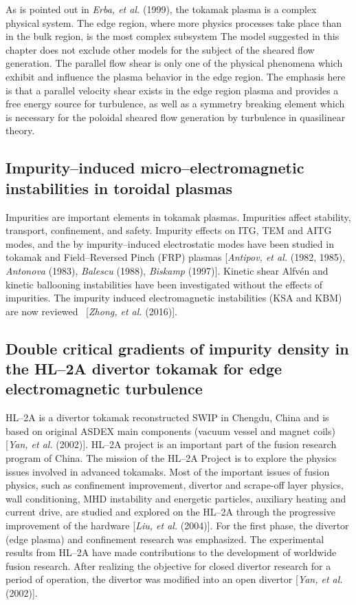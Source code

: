 \documentclass[a4paper,openany,12pt]{book}
\begin{document}
{As is pointed out in \emph{Erba, et al.} (1999), the tokamak plasma is a complex physical system. The edge region, where more physics processes take place than in the bulk region, is the most complex subsystem The model suggested in this chapter does not exclude other models for the subject of the sheared flow generation. The parallel flow shear is only one of the physical phenomena which exhibit and influence the plasma behavior in the edge region. The emphasis here is that a parallel velocity shear exists in the edge region plasma and provides a free energy source for turbulence, as well as a symmetry breaking element which is necessary for the poloidal sheared flow generation by turbulence in quasilinear theory.

\subsection{Impurity--induced micro--electromagnetic instabilities in toroidal plasmas}

Impurities are important elements in tokamak plasmas. Impurities affect stability, transport, confinement, and safety. Impurity effects on ITG, TEM and AITG modes, and the by impurity--induced electrostatic modes have been studied in tokamak and Field--Reversed Pinch (FRP) plasmas [\emph{Antipov, et al.} (1982, 1985), \emph{Antonova} (1983), \emph{Balescu} (1988), \emph{Biskamp} (1997)]. Kinetic shear Alfv\'en and kinetic ballooning instabilities have been investigated without the effects of impurities. The impurity induced electromagnetic instabilities (KSA and KBM) are now reviewed~
[\emph{Zhong, et al.} (2016)].

\subsection{Double critical gradients of impurity density in the HL--2A divertor tokamak for edge electromagnetic turbulence}

HL--2A is a divertor tokamak reconstructed  SWIP in Chengdu, China and is based on
original ASDEX main components (vacuum vessel and magnet coils) [\emph{Yan, et al.} (2002)]. HL--2A project is an important part of the fusion research program of China. The mission of the HL--2A Project is to explore the physics issues involved in advanced tokamaks. Most of the important issues of fusion physics, such as confinement improvement, divertor and scrape-off layer physics, wall
conditioning, MHD instability and energetic particles, auxiliary heating and current drive,
are studied and explored on the HL--2A through the progressive improvement of the
hardware [\emph{Liu, et al.} (2004)]. For the first phase, the divertor (edge plasma) and confinement research was emphasized. The experimental results from HL--2A have made contributions
to the development of worldwide fusion research. After realizing the objective for closed
divertor research for a period of operation, the divertor was modified into an open divertor [\emph{Yan, et al.} (2002)]. 

}
\end{document}
